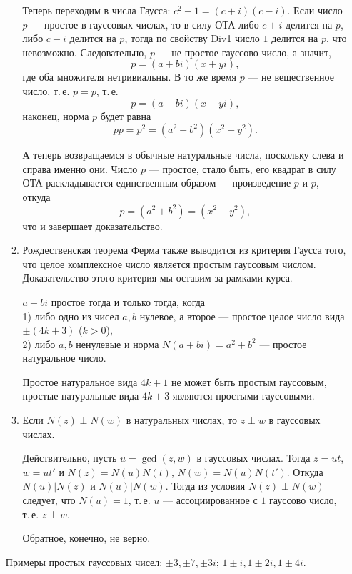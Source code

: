 \begin{enumerate}
\begin{enumerate}
Теперь переходим в числа Гаусса: $c^2+1=(c+i)(c-i)$. Если число $p$ --- простое в гауссовых числах, то в силу ОТА либо $c+i$ делится на $p$, либо $c-i$ делится на $p$, тогда по свойству Div1 число $1$ делится на $p$, что невозможно. Следовательно, $p$ --- не простое гауссово число, а значит,
$$
p = (a+bi)(x+yi),
$$
где оба множителя нетривиальны. В то же время $p$ --- не вещественное число, т.\,е. $p=\bar p$, т.\,е.
$$
p = (a-bi)(x-yi),
$$
наконец, норма $p$ будет равна
$$
p\bar p=p^2=(a^2+b^2)(x^2+y^2).
$$

А теперь возвращаемся в обычные натуральные числа, поскольку слева и справа именно они. Число $p$ --- простое, стало быть, его квадрат в силу ОТА раскладывается единственным образом --- произведение $p$ и $p$, откуда
$$
p=(a^2+b^2)=(x^2+y^2),
$$
что и завершает доказательство.
\epf

\item Рождественская теорема Ферма также выводится из критерия Гаусса того, что целое комплексное число является простым гауссовым числом. Доказательство этого критерия мы оставим за рамками курса.
\begin{thrm}
$a+bi$ простое тогда и только тогда, когда\\
\textup{1)} либо одно из чисел $a,b$ нулевое, а второе --- простое целое число вида $\pm(4k+3)$ ($k>0$), \\
\textup{2)} либо $a,b$ ненулевые и норма $N(a+bi)=a^2+b^2$ --- простое натуральное число.
\end{thrm}
\begin{sled} Простое натуральное вида $4k+1$ не может быть простым гауссовым, простые натуральные вида $4k+3$ являются простыми гауссовыми.\end{sled}

\item \label{Prim9}Если $N(z)\perp N(w)$ в натуральных числах, то $z\perp w$ в гауссовых числах.

Действительно, пусть $u=\gcd(z,w)$ в гауссовых числах. Тогда $z=ut$, $w=ut'$ и $N(z)=N(u)N(t)$, $N(w)=N(u)N(t')$. Откуда $N(u)|N(z)$ и $N(u)|N(w)$. Тогда из условия $N(z)\perp N(w)$ следует, что $N(u)=1$, т.\,е. $u$ --- ассоциированное с $1$ гауссово число, т.\,е. $z\perp w$.

Обратное, конечно, не верно.
\end{enumerate}
Примеры простых гауссовых чисел: $\pm 3, \pm 7, \pm 3i$; $1\pm i, 1\pm 2i, 1\pm 4i$.


\end{enumerate}
